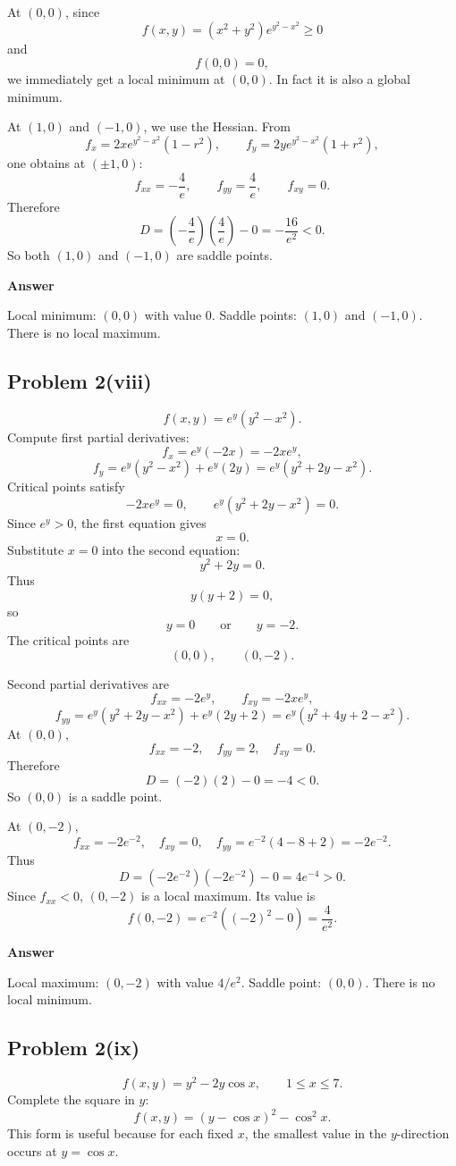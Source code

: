 \documentclass[11pt]{article}
\newenvironment{answerbox}[1]{\par\medskip\noindent\textcolor{linegreen}{\textbf{#1}}\par\smallskip}{\par\medskip}
\begin{document}
At $(0,0)$, since
\[
f(x,y)=(x^2+y^2)e^{y^2-x^2}\ge 0
\]
and
\[
f(0,0)=0,
\]
we immediately get a local minimum at $(0,0)$.  In fact it is also a global minimum.

At $(1,0)$ and $(-1,0)$, we use the Hessian. From
\[
f_x=2xe^{y^2-x^2}(1-r^2),
\qquad
f_y=2ye^{y^2-x^2}(1+r^2),
\]
one obtains at $(\pm1,0)$:
\[
f_{xx}=-\frac4e,
\qquad f_{yy}=\frac4e,
\qquad f_{xy}=0.
\]
Therefore
\[
D=\left(-\frac4e\right)\left(\frac4e\right)-0=-\frac{16}{e^2}<0.
\]
So both $(1,0)$ and $(-1,0)$ are saddle points.

\begin{answerbox}{Answer}
Local minimum: $(0,0)$ with value $0$.  Saddle points: $(1,0)$ and $(-1,0)$.  There is no local maximum.
\end{answerbox}

\subsection*{Problem 2(viii)}
\[
f(x,y)=e^y(y^2-x^2).
\]
Compute first partial derivatives:
\[
f_x=e^y(-2x)=-2xe^y,
\]
\[
f_y=e^y(y^2-x^2)+e^y(2y)=e^y(y^2+2y-x^2).
\]
Critical points satisfy
\[
-2xe^y=0,
\qquad e^y(y^2+2y-x^2)=0.
\]
Since $e^y>0$, the first equation gives
\[
x=0.
\]
Substitute $x=0$ into the second equation:
\[
y^2+2y=0.
\]
Thus
\[
y(y+2)=0,
\]
so
\[
y=0
\qquad\text{or}\qquad y=-2.
\]
The critical points are
\[
(0,0),
\qquad (0,-2).
\]

Second partial derivatives are
\[
f_{xx}=-2e^y,
\qquad f_{xy}=-2xe^y,
\]
\[
f_{yy}=e^y(y^2+2y-x^2)+e^y(2y+2)
=e^y(y^2+4y+2-x^2).
\]
At $(0,0)$,
\[
f_{xx}=-2,
\quad f_{yy}=2,
\quad f_{xy}=0.
\]
Therefore
\[
D=(-2)(2)-0=-4<0.
\]
So $(0,0)$ is a saddle point.

At $(0,-2)$,
\[
f_{xx}=-2e^{-2},
\quad f_{xy}=0,
\quad f_{yy}=e^{-2}(4-8+2)=-2e^{-2}.
\]
Thus
\[
D=(-2e^{-2})(-2e^{-2})-0=4e^{-4}>0.
\]
Since $f_{xx}<0$, $(0,-2)$ is a local maximum.
Its value is
\[
f(0,-2)=e^{-2}((-2)^2-0)=\frac4{e^2}.
\]

\begin{answerbox}{Answer}
Local maximum: $(0,-2)$ with value $4/e^2$.  Saddle point: $(0,0)$.  There is no local minimum.
\end{answerbox}

\subsection*{Problem 2(ix)}
\[
f(x,y)=y^2-2y\cos x,
\qquad 1\le x\le 7.
\]
Complete the square in $y$:
\[
f(x,y)=\left(y-\cos x\right)^2-\cos^2x.
\]
This form is useful because for each fixed $x$, the smallest value in the $y$-direction occurs at $y=\cos x$.
\end{document}
